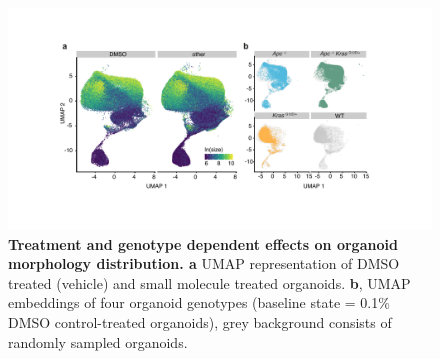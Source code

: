 \begin{flushleft}
\bigbreak
\begin{figure}[h!]
\centering
\includegraphics[width=\textwidth,
                height=\textheight,
                keepaspectratio]{figures/adenomaprofiling/pdf/fig_1_4.pdf}
\caption{\textbf{Treatment and genotype dependent effects on organoid morphology distribution. a} UMAP representation of DMSO treated (vehicle) and small molecule treated organoids. \textbf{b}, UMAP embeddings of four organoid genotypes (baseline state = 0.1\% DMSO control-treated organoids), grey background consists of randomly sampled organoids.}
\label{fig_140}
\end{figure}


\end{flushleft}
